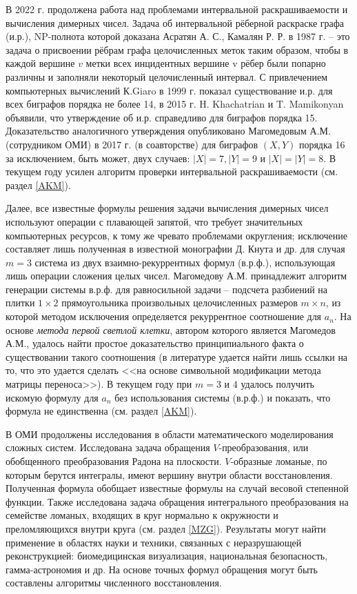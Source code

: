 В 2022 г. продолжена работа над проблемами интервальной раскрашиваемости и вычисления димерных чисел. Задача об интервальной рёберной раскраске графа (и.р.), NP-полнота которой доказана Асратян А. С., Камалян Р. Р. в 1987 г. -- это задача о присвоении рёбрам графа целочисленных меток таким образом, чтобы в каждой вершине $v$ метки всех инцидентных вершине v рёбер были попарно различны и заполняли некоторый целочисленный интервал. С привлечением компьютерных вычислений К.Giaro в 1999 г. показал существование и.р. для всех биграфов порядка не более 14, в 2015 г. H. Khachatrian и T. Mamikonyan объявили, что  утверждение об и.р. справедливо для биграфов порядка 15. Доказательство аналогичного утверждения опубликовано Магомедовым А.М. (сотрудником ОМИ) в 2017 г. (в соавторстве) для биграфов $(X,Y)$ порядка 16 за исключением, быть может, двух случаев: $|X|=7, |Y|=9$  и $|X|=|Y|=8$. В текущем году усилен алгоритм проверки интервальной раскрашиваемости (см. раздел \ref{AKM}).

Далее, все известные формулы решения задачи вычисления димерных чисел используют операции с плавающей запятой, что требует значительных компьютерных ресурсов, к тому же чревато проблемами округления; исключение составляет лишь полученная в известной монографии Д. Кнута и др. для случая $m=3$ система из двух взаимно-рекуррентных формул (в.р.ф.), использующая лишь операции сложения целых чисел.
Магомедову А.М. принадлежит алгоритм генерации системы в.р.ф. для равносильной задачи -- подсчета разбиений на плитки $1\times2$ прямоугольника произвольных целочисленных размеров $m\times n$, из которой методом исключения определяется рекуррентное соотношение для $a_n$. На основе\textit{ метода первой светлой клетки}, автором которого является Магомедов А.М., удалось найти простое доказательство принципиального факта о существовании такого соотношения (в литературе удается найти лишь ссылки на то, что это удается сделать <<на основе символьной модификации метода матрицы переноса>>).
В текущем году при $m=3$ и $4$ удалось получить искомую формулу для $a_n$ без использования системы (в.р.ф.) и показать, что формула не единственна (см. раздел \ref{AKM}). 

В ОМИ продолжены исследования в области математического моделирования сложных систем. Исследована задача обращения $V$-преобразования, или обобщенного преобразования Радона на плоскости. $V$-образные ломаные, по которым берутся интегралы, имеют вершину внутри области восстановления. Полученная формула обобщает известные формулы на случай весовой степенной функции. Также исследована задача обращения интегрального преобразования на семействе ломаных, входящих в круг нормально к окружности и преломляющихся внутри круга (см. раздел \ref{MZG}). Результаты могут найти применение в областях науки и техники, связанных с неразрушающей реконструкцией: биомедицинская визуализация, национальная безопасность, гамма-астрономия и др. На основе точных формул обращения могут быть составлены алгоритмы численного восстановления.

